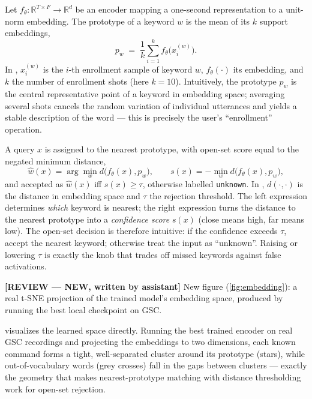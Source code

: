 \documentclass[12pt,a4paper]{report}
\newcommand{\reviewnote}[1]{%
    \par\smallskip\noindent
    \colorbox{yellow!35}{\parbox{0.97\linewidth}{\small\textbf{[REVIEW — NEW, written by assistant]}\; #1}}%
    \par\smallskip}
\newcommand{\reviewnote}[1]{}
\newcommand{\R}{\mathbb{R}}
\begin{document}
Let $f_\theta:\R^{T\times F}\!\to\!\R^{d}$ be an encoder mapping a one-second
representation to a unit-norm embedding. The prototype of a keyword $w$ is the
mean of its $k$ support embeddings,
\begin{equation}
p_w \;=\; \frac{1}{k}\sum_{i=1}^{k} f_\theta\!\big(x^{(w)}_i\big).
\label{eq:proto}
\end{equation}
In , $x^{(w)}_i$ is the $i$-th enrollment sample of keyword $w$,
$f_\theta(\cdot)$ its embedding, and $k$ the number of enrollment shots (here
$k{=}10$). Intuitively, the prototype $p_w$ is the central representative point of
a keyword in embedding space; averaging several shots cancels the random variation
of individual utterances and yields a stable description of the word --- this is
precisely the user's ``enrollment'' operation.

A query $x$ is assigned to the nearest prototype, with open-set score equal to the
negated minimum distance,
\begin{equation}
\hat w(x)=\arg\min_{w} d\!\big(f_\theta(x),p_w\big),\qquad
s(x)=-\!\min_{w} d\!\big(f_\theta(x),p_w\big),
\label{eq:score}
\end{equation}
and accepted as $\hat w(x)$ iff $s(x)\ge\tau$, otherwise labelled
\texttt{unknown}. In , $d(\cdot,\cdot)$ is the distance in embedding
space and $\tau$ the rejection threshold. The left expression determines
\emph{which} keyword is nearest; the right expression turns the distance to the
nearest prototype into a \emph{confidence score} $s(x)$ (close means high, far
means low). The open-set decision is therefore intuitive: if the confidence
exceeds $\tau$, accept the nearest keyword; otherwise treat the input as
``unknown''. Raising or lowering $\tau$ is exactly the knob that trades off missed
keywords against false activations.

\reviewnote{New figure (\ref{fig:embedding}): a real t-SNE projection of the
trained model's embedding space, produced by running the best local checkpoint on
GSC.}

 visualizes the learned space directly. Running the best
trained encoder on real GSC recordings and projecting the embeddings to two
dimensions, each known command forms a tight, well-separated cluster around its
prototype (stars), while out-of-vocabulary words (grey crosses) fall in the gaps
between clusters --- exactly the geometry that makes nearest-prototype matching
with distance thresholding work for open-set rejection.
\end{document}
